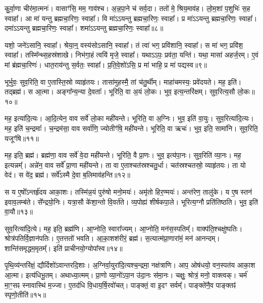 कु॒र्वा॒णा चीर॑मा॒त्मनः॑। 
वासाꣳ॑सि॒ मम॒ गाव॑श्च। 
अ॒न्न॒पा॒ने च॑ सर्व॒दा। 
ततो॑ मे॒ श्रिय॒माव॑ह। 
लो॒म॒शां प॒शुभिः॑ स॒ह स्वाहा᳚। 
आ मा॑ यन्तु ब्रह्मचा॒रिणः॒ स्वाहा᳚। 
वि मा॑ऽऽयन्तु ब्रह्मचा॒रिणः॒ स्वाहा᳚। 
प्र मा॑ऽऽयन्तु ब्रह्मचा॒रिणः॒ स्वाहा᳚। 
दमा॑ऽऽयन्तु ब्रह्मचा॒रिणः॒ स्वाहा᳚। 
शमा॑ऽऽयन्तु ब्रह्मचा॒रिणः॒ स्वाहा᳚॥८॥

यशो॒ जने॑ऽसानि॒ स्वाहा᳚। 
श्रेया॒न्॒ वस्य॑सोऽसानि॒ स्वाहा᳚। 
तं त्वा॑ भग॒ प्रवि॑शानि॒ स्वाहा᳚। 
स मा॑ भग॒ प्रवि॑श॒ स्वाहा᳚। 
तस्मि᳚न्थ्स॒हस्र॑शाखे। 
निभ॑गा॒हं त्वयि॑ मृजे॒ स्वाहा᳚। 
यथाऽऽपः॒ प्रव॑ता॒ यन्ति॑। 
यथा॒ मासा॑ अहर्ज॒रम्। 
ए॒वं मां ब्र॑ह्मचा॒रिणः॑। 
धात॒राय॑न्तु स॒र्वतः॒ स्वाहा᳚। 
प्र॒ति॒वे॒शो॑ऽसि॒ प्र मा॑ भाहि॒ प्र मा॑ पद्यस्व॥९॥
\anuvakamend[वि॒त॒न्वा॒ना शमा॑ऽऽयन्तु ब्रह्मचा॒रिणः॒ स्वाहा॒ धात॒राय॑न्तु स॒र्वतः॒ स्वाहैकं॑ च]


भूर्भुवः॒ सुव॒रिति॒ वा ए॒तास्ति॒स्रो व्याहृ॑तयः। 
तासा॑मुहस्मै॒ तां च॑तु॒र्थीम्। 
माहा॑चमस्यः॒ प्रवे॑दयते। 
मह॒ इति॑। 
तद्ब्रह्म॑। 
स आ॒त्मा। 
अङ्गा᳚न्य॒न्या दे॒वताः᳚। 
भूरिति॒ वा अ॒यं लो॒कः। 
भुव॒ इत्य॒न्तरि॑क्षम्। 
सुव॒रित्य॒सौ लो॒कः॥१०॥

मह॒ इत्या॑दि॒त्यः। 
आ॒दि॒त्येन॒ वाव सर्वे॑ लो॒का मही॑यन्ते। 
भूरिति॒ वा अ॒ग्निः। 
भुव॒ इति॑ वा॒युः। 
सुव॒रित्या॑दि॒त्यः। 
मह॒ इति॑ च॒न्द्रमाः᳚। 
च॒न्द्रम॑सा॒ वाव सर्वा॑णि॒ ज्योतीꣳ॑षि॒ मही॑यन्ते। 
भूरिति॒ वा ऋचः॑। 
भुव॒ इति॒ सामा॑नि। 
सुव॒रिति॒ यजूꣳ॑षि॥११॥

मह॒ इति॒ ब्रह्म॑। 
ब्रह्म॑णा॒ वाव सर्वे॑ वे॒दा मही॑यन्ते। 
भूरिति॒ वै प्रा॒णः। 
भुव॒ इत्य॑पा॒नः। 
सुव॒रिति॑ व्या॒नः। 
मह॒ इत्यन्नम्᳚। 
अन्ने॑न॒ वाव सर्वे᳚ प्रा॒णा मही॑यन्ते। 
ता वा ए॒ताश्चत॑स्रश्चतु॒र्धा। 
चत॑स्रश्चतस्रो॒ व्याहृ॑तयः। 
ता यो वेद॑। 
स वे॑द॒ ब्रह्म॑। 
सर्वे᳚ऽस्मै दे॒वा ब॒लिमाव॑हन्ति॥१२॥
\anuvakamend[अ॒सौ लो॒को यजूꣳ॑षि॒ वेद॒ द्वे च॑]

स य ए॒षो᳚ऽन्तर्\mbox{}हृ॑दय आका॒शः। 
तस्मि॑न्न॒यं पुरु॑षो मनो॒मयः॑। 
अमृ॑तो हिर॒ण्मयः॑। 
अन्त॑रेण॒ तालु॑के। 
य ए॒ष स्तन॑ इवाव॒\-लम्ब॑ते। 
से᳚न्द्रयो॒निः। 
यत्रा॒सौ के॑शा॒न्तो वि॒वर्त॑ते। 
व्य॒पोह्य॑ शीर्\mbox{}षकपा॒ले। 
भूरित्य॒ग्नौ प्रति॑\-तिष्ठति। 
भुव॒ इति॑ वा॒यौ॥१३॥

सुव॒रित्या॑दि॒त्ये। 
मह॒ इति॒ ब्रह्म॑णि। 
आ॒प्नोति॒ स्वारा᳚ज्यम्। 
आ॒प्नोति॒ मन॑स॒स्पतिम्᳚। 
वाक्प॑ति॒श्चक्षु॑ष्पतिः। 
श्रोत्र॑पतिर्वि॒\-ज्ञान॑पतिः। 
ए॒तत्ततो॑ भवति। 
आ॒का॒शश॑रीरं॒ ब्रह्म॑। 
स॒त्यात्म॑प्रा॒णारा॑मं॒ मन॑ आनन्दम्। 
शान्ति॑समृद्धम॒मृतम्᳚। 
इति॑ प्राचीनयो॒ग्योपा᳚स्व॥१४॥
\anuvakamend[वा॒याव॒मृत॒मेकं॑ च]

पृ॒थि॒व्य॑न्तरि॑क्षं॒ द्यौर्दिशो॑ऽवान्तरदि॒शाः। 
अ॒ग्निर्वा॒युरा॑दि॒त्य\-श्च॒न्द्रमा॒ नक्ष॑त्राणि। 
आप॒ ओष॑धयो॒ वन॒स्पत॑य आका॒श आ॒त्मा। 
इत्य॑धि\-भू॒तम्। 
अथाध्या॒त्मम्। 
प्रा॒णो व्या॒नो॑ऽपा॒न उ॑दा॒नः स॑मा॒नः। 
चक्षुः॒ श्रोत्रं॒ मनो॒ वाक्त्वक्। 
चर्म॑ मा॒ꣳ॒सꣴ स्नावास्थि॑ म॒ज्जा। 
ए॒तद॑धि वि॒धाय॒\-र्\mbox{}षि॒\-रवो॑चत्। 
पाङ्क्तं॒ वा इ॒दꣳ सर्वम्᳚। 
पाङ्क्ते॑नै॒व पाङ्क्तꣴ॑ स्पृणो॒तीति॑॥१५॥
\anuvakamend[सर्व॒मेकं॑ च]

